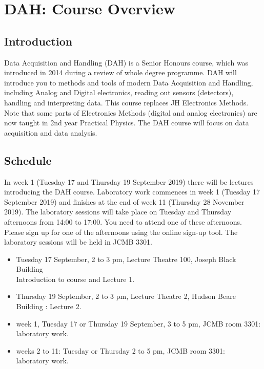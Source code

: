 \chapter{DAH: Course Overview}
\label{sec:overview}

\section{Introduction}

Data Acquisition and Handling (DAH) is a  Senior Honours course, which was introduced in 2014 during a review of whole degree programme. DAH will introduce you to methods and tools of modern Data Acquisition and Handling, including Analog and Digital electronics, reading out sensors (detectors), handling and interpreting data. This course replaces JH Electronics Methods. Note that some parts of Electronics Methods (digital and analog electronics) are now taught in 2nd year Practical Physics. The DAH course will focus on data acquisition and data analysis.


\section{Schedule}
In week 1 (Tuesday 17 and Thursday 19 September 2019)
there will be lectures %
introducing the DAH course.
Laboratory work commences in week 1 (Tuesday 17 September 2019) and finishes at the end of week 11 (Thursday 28 November 2019). The laboratory sessions will take place on Tuesday and Thursday afternoons from 14:00 to 17:00. You need to attend one of these afternoons. Please sign up for one of the afternoons using the online sign-up tool. The laboratory sessions will be held in JCMB 3301.
\begin{itemize}
\item Tuesday 17 September, 2 to 3 pm,  Lecture Theatre 100, Joseph Black Building \\Introduction to course and Lecture 1.
\item Thursday 19 September, 2 to 3 pm, Lecture Theatre 2, Hudson Beare Building : Lecture 2.
\item week 1, Tuesday 17 or Thursday  19 September, 3 to 5 pm, JCMB room 3301: \\laboratory work.
\item weeks 2 to 11:  Tuesday or Thursday 2 to 5 pm, JCMB room 3301: \\laboratory work.
\end{itemize}



